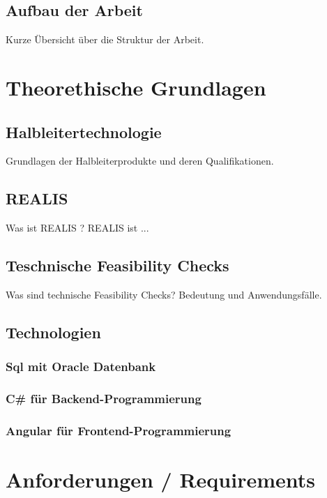 \documentclass[fontsize=12pt,
parskip=half,	%
department=FakM,  %
twoside, %
DIV=15,BCOR=10mm, %
]{OTHRreprt}
\begin{document}
	\section{Aufbau der Arbeit}
	Kurze Übersicht über die Struktur der Arbeit.

	\chapter{Theorethische Grundlagen}
	\section{Halbleitertechnologie}
	Grundlagen der Halbleiterprodukte und deren Qualifikationen.

	\section{REALIS}

	Was ist \ac{REALIS} ? \ac{REALIS} ist ...

	\section{Teschnische Feasibility Checks}
	Was sind technische Feasibility Checks? Bedeutung und Anwendungsfälle.

	\section{Technologien}

	\subsection{Sql mit Oracle Datenbank}

	\subsection{C\# für Backend-Programmierung}

	\subsection{Angular für Frontend-Programmierung}



	\chapter{Anforderungen / Requirements}
\end{document}

